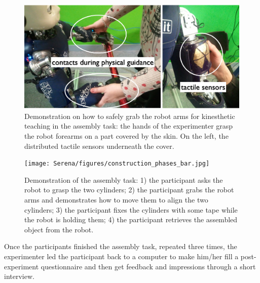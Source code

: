 \begin{figure}[ht!]
\centering
\includegraphics[width=0.7\hsize]{Serena/figures/contacts_guidance.png}
\caption{Demonstration on how to safely grab the robot arms for kinesthetic teaching in the assembly task: the hands of the experimenter grasp the robot forearms on a part covered by the skin. On the left, the distributed tactile sensors underneath the cover.}
\label{fig:contacts}
\end{figure}


\begin{figure}[ht!]
\centering
\texttt{[image: Serena/figures/construction\_phases\_bar.jpg]}
\caption{Demonstration of the assembly task: 1) the participant asks the robot to grasp the two cylinders; 2) the participant grabs the robot arms and demonstrates how to move them to align the two cylinders; 3) the participant fixes the cylinders with some tape while the robot is holding them; 4) the participant retrieves the assembled object from the robot. }
\label{fig:task}
\end{figure}

Once the participants finished the assembly task, repeated three times, the experimenter led the participant back to a computer to make him/her fill a post-experiment questionnaire and then get feedback and impressions through a short interview.

